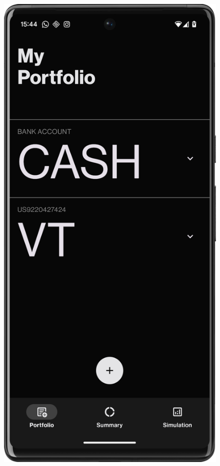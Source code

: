\begin{figure}[H]
    \centering
    \begin{minipage}{0.24\textwidth}
        \centering
        \includegraphics[width=\textwidth]{foto/portfolio_screen}

\end{minipage}
\end{figure}
